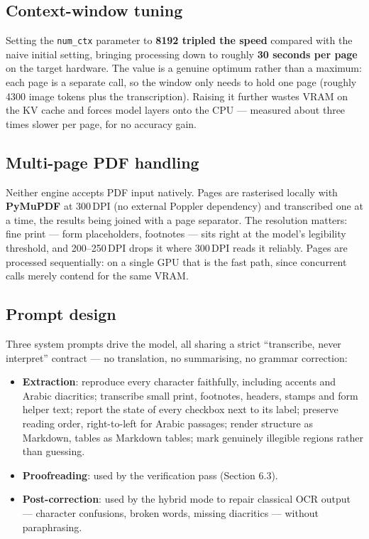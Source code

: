 \documentclass[11pt,a4paper]{article}
\begin{document}
\subsection{Context-window tuning}

Setting the \texttt{num\_ctx} parameter to \textbf{8192 tripled the speed}
compared with the naive initial setting, bringing processing down to roughly
\textbf{30 seconds per page} on the target hardware. The value is a genuine
optimum rather than a maximum: each page is a separate call, so the window only
needs to hold one page (roughly 4300 image tokens plus the transcription).
Raising it further wastes VRAM on the KV cache and forces model layers onto the
CPU --- measured about three times slower per page, for no accuracy gain.

\subsection{Multi-page PDF handling}

Neither engine accepts PDF input natively. Pages are rasterised locally with
\textbf{PyMuPDF} at 300\,DPI (no external Poppler dependency) and transcribed
one at a time, the results being joined with a page separator. The resolution
matters: fine print --- form placeholders, footnotes --- sits right at the
model's legibility threshold, and 200--250\,DPI drops it where 300\,DPI reads
it reliably. Pages are processed sequentially: on a single GPU that is the fast
path, since concurrent calls merely contend for the same VRAM.

\subsection{Prompt design}

Three system prompts drive the model, all sharing a strict
``transcribe, never interpret'' contract --- no translation, no summarising, no
grammar correction:
\begin{itemize}
  \item \textbf{Extraction}: reproduce every character faithfully, including
        accents and Arabic diacritics; transcribe small print, footnotes,
        headers, stamps and form helper text; report the state of every
        checkbox next to its label; preserve reading order, right-to-left for
        Arabic passages; render structure as Markdown, tables as Markdown
        tables; mark genuinely illegible regions rather than guessing.
  \item \textbf{Proofreading}: used by the verification pass (Section 6.3).
  \item \textbf{Post-correction}: used by the hybrid mode to repair classical
        OCR output --- character confusions, broken words, missing diacritics
        --- without paraphrasing.
\end{itemize}
\end{document}
